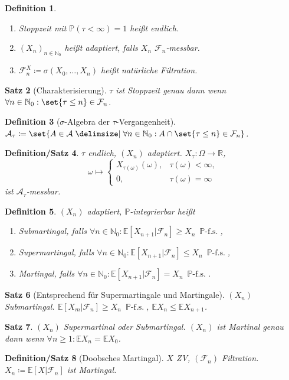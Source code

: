 \documentclass[a4paper,8pt]{article}
\newcounter{Sec}
\theoremstyle{nonumberbreak}
\newtheorem{definition}{Definition}[Sec]
\newtheorem{satz}[definition]{Satz}
\newtheorem{defsatz}[definition]{Definition/Satz}
\newcommand{\defas}{\coloneqq}
\renewcommand{\P}{\mathbb{P}}
\newcommand{\R}{\mathbb{R}}
\newcommand{\F}{\mathcal{F}}
\newcommand{\E}{\mathbb{E}}
\newcommand{\EV}[2]{\E[#1|#2]}
\newcommand{\N}{\mathbb{N}}
\newcommand{\fs}[1]{~\operatorname{#1-f.s.}}
\begin{document}
\begin{multicols*}{3}
\begin{definition}
\begin{enumerate}[label=(\alph*)]
			\item Stoppzeit mit $\P(\tau<\infty)=1$ heißt endlich.
			\item $(X_n)_{n\in\N_0}$ heißt adaptiert, falls $X_n$ $\F_n$-messbar.
			\item $\F_n^X\defas\sigma(X_0,\ldots,X_n)$ heißt natürliche Filtration.
		\end{enumerate}
	\end{definition}
	\begin{satz}[Charakterisierung]
		$\tau$ ist Stoppzeit genau dann wenn $\forall n\in\N_0:\set{\tau\leq n}\in\F_n$.
	\end{satz}
	\begin{definition}[$\sigma$-Algebra der $\tau$-Vergangenheit]
		$\mathcal{A}_\tau\defas\set{A\in\mathcal{A}\given \forall n\in\N_0:A\cap\set{\tau\leq n}\in\F_n}$.
	\end{definition}
	\begin{defsatz}
		$\tau$ endlich, $(X_n)$ adaptiert. $X_\tau\colon\Omega\to\R$,
		\[
			\omega\mapsto\begin{cases}
				X_{\tau(\omega)}(\omega), &\tau(\omega)<\infty,\\
				0, &\tau(\omega)=\infty
			\end{cases}
		\]
		ist $\mathcal{A}_\tau$-messbar.
	\end{defsatz}
	\begin{definition}
		$(X_n)$ adaptiert, $\P$-integrierbar heißt
		\begin{enumerate}[label=(\alph*)]
			\item Submartingal, falls $\forall n\in\N_0:\EV{X_{n+1}}{\F_n}\geq X_n\fs{\P}$,
			\item Supermartingal, falls $\forall n\in\N_0:\EV{X_{n+1}}{\F_n}\leq X_n\fs{\P}$,
			\item Martingal, falls $\forall n\in\N_0:\EV{X_{n+1}}{\F_n} = X_n\fs{\P}$.
		\end{enumerate}
	\end{definition}
	\begin{satz}[Entsprechend für Supermartingale und Martingale]
		$(X_n)$ Submartingal. $\EV{X_m}{\F_n}\geq X_n\fs\P$, $\E X_n\leq \E X_{n+1}$.
	\end{satz}
	\begin{satz}
		$(X_n)$ Supermartinal oder Submartingal. $(X_n)$ ist Martinal genau dann wenn
		$\forall n\geq 1:\E X_n = \E X_0$.
	\end{satz}
	\begin{defsatz}[Doobsches Martingal]
		$X$ ZV, $(\F_n)$ Filtration. $X_n\defas\EV{X}{\F_n}$ ist Martingal.

\end{defsatz}
\end{multicols*}
\end{document}
